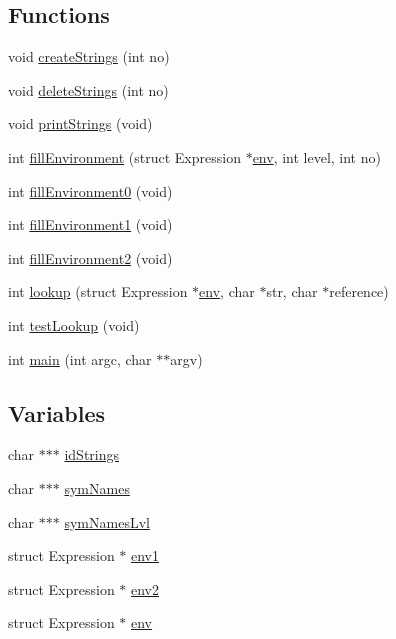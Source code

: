 \subsection*{Functions}
\begin{DoxyCompactItemize}
\item 
void \hyperlink{test-env_8c_ab34af3ec9119860781988fc71765d6fe}{create\+Strings} (int no)
\item 
void \hyperlink{test-env_8c_a0e3b4886cb359d877a5cdb82f160eb74}{delete\+Strings} (int no)
\item 
void \hyperlink{test-env_8c_a13963d514a0ab2fc3a14a7d79e7916d8}{print\+Strings} (void)
\item 
int \hyperlink{test-env_8c_ac5afe7950f2ae8655b39a63bcdaadd18}{fill\+Environment} (struct Expression $\ast$\hyperlink{test-env_8c_a57378699c80a40509e334ce55c228738}{env}, int level, int no)
\item 
int \hyperlink{test-env_8c_a837b9d2205f101887bbd13aa1e115905}{fill\+Environment0} (void)
\item 
int \hyperlink{test-env_8c_a882ad54500d5d9eb094a41e217b16233}{fill\+Environment1} (void)
\item 
int \hyperlink{test-env_8c_a5ca2a641dbd6d0f6b7d3e0632f9746d1}{fill\+Environment2} (void)
\item 
int \hyperlink{test-env_8c_a32b53c3ec08a510d87bfedc8c6789353}{lookup} (struct Expression $\ast$\hyperlink{test-env_8c_a57378699c80a40509e334ce55c228738}{env}, char $\ast$str, char $\ast$reference)
\item 
int \hyperlink{test-env_8c_aafae277c126a2997967714bab08bd3a4}{test\+Lookup} (void)
\item 
int \hyperlink{test-env_8c_a3c04138a5bfe5d72780bb7e82a18e627}{main} (int argc, char $\ast$$\ast$argv)
\end{DoxyCompactItemize}
\subsection*{Variables}
\begin{DoxyCompactItemize}
\item 
char $\ast$$\ast$$\ast$ \hyperlink{test-env_8c_a97bb24ae0839f389060733beec1376b0}{id\+Strings}
\item 
char $\ast$$\ast$$\ast$ \hyperlink{test-env_8c_a52ebb6b2eb06f5014e20b871c73a8083}{sym\+Names}
\item 
char $\ast$$\ast$$\ast$ \hyperlink{test-env_8c_af1e0dfb3e5d028d45f88d85d09998488}{sym\+Names\+Lvl}
\item 
struct Expression $\ast$ \hyperlink{test-env_8c_a0ee24e38579020c326e0b5d86aadeddc}{env1}
\item 
struct Expression $\ast$ \hyperlink{test-env_8c_a0ab389de8b073923374f9de2233e9562}{env2}
\item 
struct Expression $\ast$ \hyperlink{test-env_8c_a57378699c80a40509e334ce55c228738}{env}
\end{DoxyCompactItemize}


